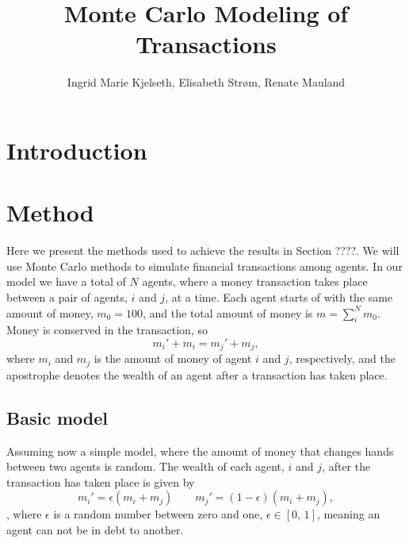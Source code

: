 \documentclass[a4paper,10pt,english]{article}
\title{Monte Carlo Modeling of Transactions}
\author{Ingrid Marie Kjelseth, Elisabeth Strøm, Renate Mauland}
\begin{document}
\maketitle

\pagebreak

\tableofcontents

\pagebreak

\begin{abstract}

\end{abstract}

\section{Introduction}



\section{Method}
Here we present the methods used to achieve the results in Section ????.
We will use Monte Carlo methods to simulate financial transactions among agents. In our model we have a total of $N$ agents, where a money transaction takes place between a pair of agents, $i$ and $j$, at a time. Each agent starts of with the same amount of money, $m_0=100$, and the total amount of money is $m=\sum^N_i m_0$. Money is conserved in the transaction, so 
\begin{equation}\label{eq:conserved}
m_i'+m_i = m_j' + m_j,
\end{equation}
where $m_i$ and $m_j$ is the amount of money of agent $i$ and $j$, respectively, and the apostrophe denotes the wealth of an agent after a transaction has taken place.
\subsection{Basic model}
Assuming now a simple model, where the amount of money that changes hands between two agents is random. The wealth of each agent, $i$ and $j$, after the transaction has taken place is given by
\begin{equation}
m_i' =\epsilon (m_i+m_j)\qquad m_j' = (1-\epsilon)(m_i +m_j),
\end{equation},
where $\epsilon$ is a random number between zero and one, $\epsilon \in [0,\,1]$, meaning an agent can not be in debt to another. 
\end{document}
